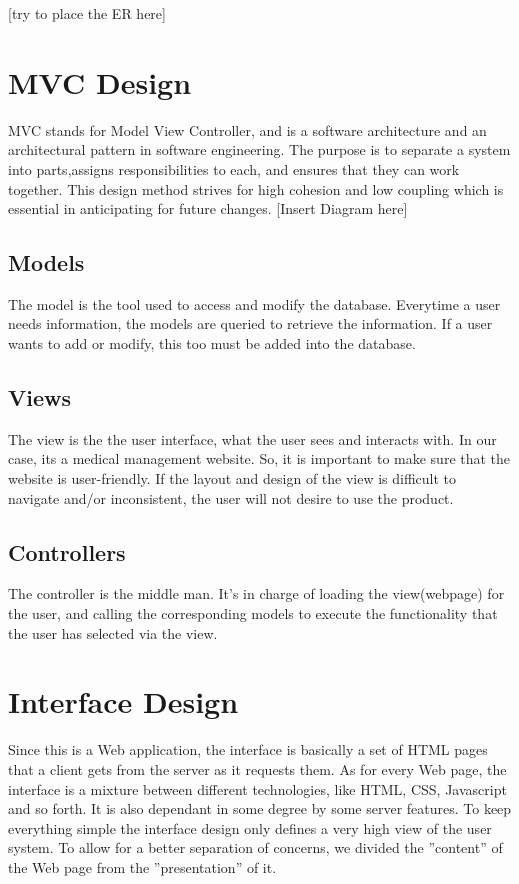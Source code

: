 \documentclass[12pt]{report}
\begin{document}
[try to place the ER here]


\section{MVC Design}

MVC stands for Model View Controller, and is a software architecture and an architectural pattern in software engineering. The purpose is to separate a system into parts,assigns responsibilities to each, and ensures that they can work together. This design method strives for high cohesion and low coupling which is essential in anticipating for future changes.
[Insert Diagram here]

\subsection{Models}
The model is the tool used to access and modify the database. Everytime a user needs information, the models are queried to retrieve the information. If a user wants to add or modify, this too must be added into the database. 

\subsection{Views}
The view is the the user interface, what the user sees and interacts with. In our case, its a medical management website. So, it is important to make sure that the website is user-friendly. If the layout and design of the view is difficult to navigate and/or inconsistent, the user will not desire to use the product. 

\subsection{Controllers}
The controller is the middle man. It's in charge of loading the view(webpage) for the user, and calling the corresponding models to execute the functionality that the user has selected via the view. 

\section{Interface Design}
Since this is a Web application, the interface is basically a set of HTML pages that a client gets from the server as it requests them. As for every Web page, the interface is a mixture between different technologies, like HTML, CSS, Javascript and so forth. It is also dependant in some degree by some server features. To keep everything simple the interface design only defines a very high view of the user system. To allow for a better separation of concerns, we divided the ''content'' of the Web page from the ''presentation'' of it.
\end{document}
